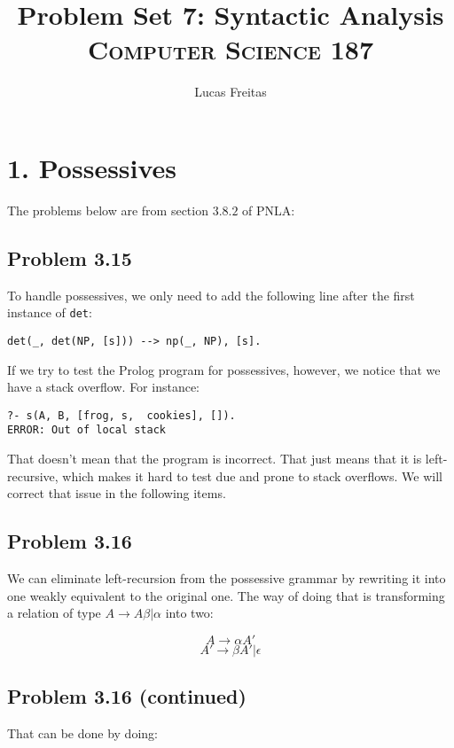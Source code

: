 \documentclass[12pt]{article}
\makeatletter
\newenvironment{problem x}{\@startsection
       {section}
       {1}
       {-.2em}
       {-3.5ex plus -1ex minus -.2ex}
       {2.3ex plus .2ex}
       {\pagebreak[3] %
       \large\bf\noindent{Problem }
       }
       }
       {%
       \begin{center}\large\bf \ldots\ldots\ldots\end{center}}
\makeatother
\begin{document}
\title{Problem Set 7: Syntactic Analysis\\\textsc{Computer Science 187}}
\author{Lucas Freitas}

\maketitle

\thispagestyle{empty}


\section*{1. Possessives}

  The problems below are from section $3.8.2$ of PNLA:

  \subsection*{Problem 3.15}
    To handle possessives, we only need to add the following line after the first instance of \texttt{det}:
    \begin{verbatim}
det(_, det(NP, [s])) --> np(_, NP), [s].
    \end{verbatim}
    If we try to test the Prolog program for possessives, however, we notice that we have a stack overflow. For instance: 
    \begin{verbatim}
?- s(A, B, [frog, s,  cookies], []).
ERROR: Out of local stack
    \end{verbatim}
    That doesn't mean that the program is incorrect. That just means that it is left-recursive, which makes it hard to test due and prone to stack overflows. We will correct that issue in the following items.

  \subsection*{Problem 3.16}
    We can eliminate left-recursion from the possessive grammar by rewriting it into one weakly equivalent to the original one. The way of doing that is transforming a relation of type $A \rightarrow A\beta | \alpha$ into two:

    $$A\rightarrow \alpha A'$$
    $$A' \rightarrow \beta A' | \epsilon$$

    \newpage
  \subsection*{Problem 3.16 (continued)}
    That can be done by doing:
\end{document}
